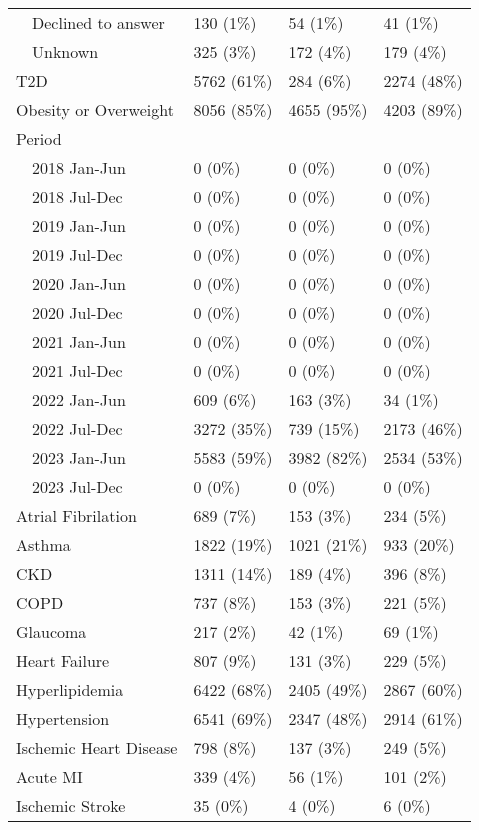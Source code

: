 \begin{longtable}{p{}p{}p{}p{}}
    Declined to answer & 130 (1\%) & 54 (1\%) & 41 (1\%) \\ 
    Unknown & 325 (3\%) & 172 (4\%) & 179 (4\%) \\ 
  T2D & 5762 (61\%) & 284 (6\%) & 2274 (48\%) \\ 
  Obesity or Overweight & 8056 (85\%) & 4655 (95\%) & 4203 (89\%) \\ 
  Period &  &  &  \\ 
    2018 Jan-Jun & 0 (0\%) & 0 (0\%) & 0 (0\%) \\ 
    2018 Jul-Dec & 0 (0\%) & 0 (0\%) & 0 (0\%) \\ 
    2019 Jan-Jun & 0 (0\%) & 0 (0\%) & 0 (0\%) \\ 
    2019 Jul-Dec & 0 (0\%) & 0 (0\%) & 0 (0\%) \\ 
    2020 Jan-Jun & 0 (0\%) & 0 (0\%) & 0 (0\%) \\ 
    2020 Jul-Dec & 0 (0\%) & 0 (0\%) & 0 (0\%) \\ 
    2021 Jan-Jun & 0 (0\%) & 0 (0\%) & 0 (0\%) \\ 
    2021 Jul-Dec & 0 (0\%) & 0 (0\%) & 0 (0\%) \\ 
    2022 Jan-Jun & 609 (6\%) & 163 (3\%) & 34 (1\%) \\ 
    2022 Jul-Dec & 3272 (35\%) & 739 (15\%) & 2173 (46\%) \\ 
    2023 Jan-Jun & 5583 (59\%) & 3982 (82\%) & 2534 (53\%) \\ 
    2023 Jul-Dec & 0 (0\%) & 0 (0\%) & 0 (0\%) \\ 
  Atrial Fibrilation & 689 (7\%) & 153 (3\%) & 234 (5\%) \\ 
  Asthma & 1822 (19\%) & 1021 (21\%) & 933 (20\%) \\ 
  CKD & 1311 (14\%) & 189 (4\%) & 396 (8\%) \\ 
  COPD & 737 (8\%) & 153 (3\%) & 221 (5\%) \\ 
  Glaucoma & 217 (2\%) & 42 (1\%) & 69 (1\%) \\ 
  Heart Failure & 807 (9\%) & 131 (3\%) & 229 (5\%) \\ 
  Hyperlipidemia & 6422 (68\%) & 2405 (49\%) & 2867 (60\%) \\ 
  Hypertension & 6541 (69\%) & 2347 (48\%) & 2914 (61\%) \\ 
  Ischemic Heart Disease & 798 (8\%) & 137 (3\%) & 249 (5\%) \\ 
  Acute MI & 339 (4\%) & 56 (1\%) & 101 (2\%) \\ 
  Ischemic Stroke & 35 (0\%) & 4 (0\%) & 6 (0\%) \\ 

\end{longtable}

